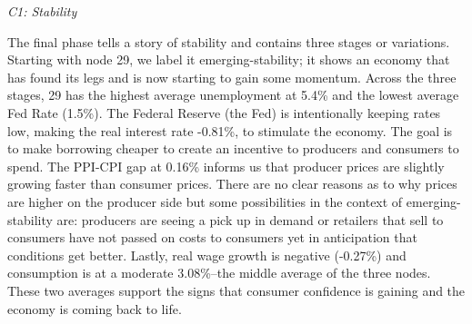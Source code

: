 \documentclass[
  10pt,
  letterpaper,
  DIV=11,
  numbers=noendperiod]{scrartcl}
\begin{document}
\begin{table}[H]


\caption{\label{tbl-Discussion_Data}Data used to review nodes, included
additional data that was excluded from out point cloud.}

\end{table}%

\emph{C1: Stability}

The final phase tells a story of stability and contains three stages or
variations. Starting with node 29, we label it emerging-stability; it
shows an economy that has found its legs and is now starting to gain
some momentum. Across the three stages, 29 has the highest average
unemployment at 5.4\% and the lowest average Fed Rate (1.5\%). The
Federal Reserve (the Fed) is intentionally keeping rates low, making the
real interest rate -0.81\%, to stimulate the economy. The goal is to
make borrowing cheaper to create an incentive to producers and consumers
to spend. The PPI-CPI gap at 0.16\% informs us that producer prices are
slightly growing faster than consumer prices. There are no clear reasons
as to why prices are higher on the producer side but some possibilities
in the context of emerging-stability are: producers are seeing a pick up
in demand or retailers that sell to consumers have not passed on costs
to consumers yet in anticipation that conditions get better. Lastly,
real wage growth is negative (-0.27\%) and consumption is at a moderate
3.08\%--the middle average of the three nodes. These two averages
support the signs that consumer confidence is gaining and the economy is
coming back to life.
\end{document}
